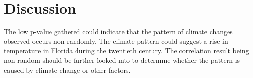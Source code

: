 \documentclass{article}
\begin{document}
\section{Discussion}
The low p-value gathered could indicate that the pattern of climate changes observed occurs non-randomly.
The climate pattern could suggest a rise in temperature in Florida during the twentieth century.
The correlation result being non-random should be further looked into to determine whether the pattern is caused by climate change or other factors.


    
\end{document}
